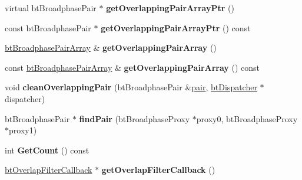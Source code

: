 \begin{DoxyCompactItemize}
\item 
\hypertarget{classbt_hashed_overlapping_pair_cache_a9c73398dc9892084bdb17847033f9c94}{virtual bt\+Broadphase\+Pair $\ast$ {\bfseries get\+Overlapping\+Pair\+Array\+Ptr} ()}\label{classbt_hashed_overlapping_pair_cache_a9c73398dc9892084bdb17847033f9c94}

\item 
\hypertarget{classbt_hashed_overlapping_pair_cache_a8bc1fb03edf04d7190905b1f89a6fa52}{const bt\+Broadphase\+Pair $\ast$ {\bfseries get\+Overlapping\+Pair\+Array\+Ptr} () const }\label{classbt_hashed_overlapping_pair_cache_a8bc1fb03edf04d7190905b1f89a6fa52}

\item 
\hypertarget{classbt_hashed_overlapping_pair_cache_aaca68aaa41dacb5791fe90f7fc284e7c}{\hyperlink{classbt_aligned_object_array}{bt\+Broadphase\+Pair\+Array} \& {\bfseries get\+Overlapping\+Pair\+Array} ()}\label{classbt_hashed_overlapping_pair_cache_aaca68aaa41dacb5791fe90f7fc284e7c}

\item 
\hypertarget{classbt_hashed_overlapping_pair_cache_a961ac84996da5d933cdc5e11d0502f26}{const \hyperlink{classbt_aligned_object_array}{bt\+Broadphase\+Pair\+Array} \& {\bfseries get\+Overlapping\+Pair\+Array} () const }\label{classbt_hashed_overlapping_pair_cache_a961ac84996da5d933cdc5e11d0502f26}

\item 
\hypertarget{classbt_hashed_overlapping_pair_cache_a114297f90c75db7d8ab95b3a24084b6f}{void {\bfseries clean\+Overlapping\+Pair} (bt\+Broadphase\+Pair \&\hyperlink{structpair}{pair}, \hyperlink{classbt_dispatcher}{bt\+Dispatcher} $\ast$dispatcher)}\label{classbt_hashed_overlapping_pair_cache_a114297f90c75db7d8ab95b3a24084b6f}

\item 
\hypertarget{classbt_hashed_overlapping_pair_cache_a386a5334130b85783393fc7c8fd05ffb}{bt\+Broadphase\+Pair $\ast$ {\bfseries find\+Pair} (bt\+Broadphase\+Proxy $\ast$proxy0, bt\+Broadphase\+Proxy $\ast$proxy1)}\label{classbt_hashed_overlapping_pair_cache_a386a5334130b85783393fc7c8fd05ffb}

\item 
\hypertarget{classbt_hashed_overlapping_pair_cache_a8ac591b051485e2f772e3535a5a06946}{int {\bfseries Get\+Count} () const }\label{classbt_hashed_overlapping_pair_cache_a8ac591b051485e2f772e3535a5a06946}

\item 
\hypertarget{classbt_hashed_overlapping_pair_cache_a423c20dadb90c50a5a889e4a649e35ff}{\hyperlink{structbt_overlap_filter_callback}{bt\+Overlap\+Filter\+Callback} $\ast$ {\bfseries get\+Overlap\+Filter\+Callback} ()}\label{classbt_hashed_overlapping_pair_cache_a423c20dadb90c50a5a889e4a649e35ff}


\end{DoxyCompactItemize}
